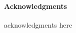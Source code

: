 \documentclass[runningheads,orivec]{llncs}
\date{\today}					%
\def\acknowledgmenttext{
	acknowledgments here
}
\begin{document}





%




\checkfornotes
\ifnum{}
	\ifnum{}
		\paragraph{Acknowledgments}
		\acknowledgmenttext
	\fi
\fi
\ifnum{}
	
\else
	
\fi
\appendix




\end{document}
